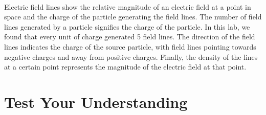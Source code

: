 \documentclass[oneside,12pt]{amsart}
\begin{document}
\paragraph{}
\indent Electric field lines show the relative magnitude of an electric field at a point in space and the charge of the particle generating the field lines. The number of field lines generated by a particle signifies the charge of the particle. In this lab, we found that every unit of charge generated 5 field lines. The direction of the field lines indicates the charge of the source particle, with field lines pointing towards negative charges and away from positive charges. Finally, the density of the lines at a certain point represents the magnitude of the electric field at that point.

\section{Test Your Understanding}
\end{document}
